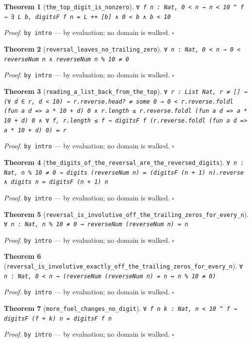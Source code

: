 \documentclass[11pt]{article}
\newtheorem{theorem}{Theorem}[section]
\begin{document}
\begin{theorem}[\texttt{the\_top\_digit\_is\_nonzero}]
\texttt{∀ f n : Nat, 0 < n → n < 10 ^ f → ∃ L b, digitsF f n = L ++ [b] ∧ 0 < b ∧ b < 10}
\end{theorem}
\noindent\emph{Proof.} \texttt{by
  intro} --- by evaluation; no domain is walked. \hfill$\square$

\begin{theorem}[\texttt{reversal\_leaves\_no\_trailing\_zero}]
\texttt{∀ n : Nat, 0 < n → 0 < reverseNum n ∧ reverseNum n \% 10 ≠ 0}
\end{theorem}
\noindent\emph{Proof.} \texttt{by
  intro} --- by evaluation; no domain is walked. \hfill$\square$

\begin{theorem}[\texttt{reading\_a\_list\_back\_from\_the\_top}]
\texttt{∀ r : List Nat, r ≠ [] → (∀ d ∈ r, d < 10) → r.reverse.head? ≠ some 0 → 0 < r.reverse.foldl (fun a d => a * 10 + d) 0 ∧ r.length ≤ r.reverse.foldl (fun a d => a * 10 + d) 0 ∧ ∀ f, r.length ≤ f → digitsF f (r.reverse.foldl (fun a d => a * 10 + d) 0) = r}
\end{theorem}
\noindent\emph{Proof.} \texttt{by
  intro} --- by evaluation; no domain is walked. \hfill$\square$

\begin{theorem}[\texttt{the\_digits\_of\_the\_reversal\_are\_the\_reversed\_digits}]
\texttt{∀ n : Nat, n \% 10 ≠ 0 → digits (reverseNum n) = (digitsF (n + 1) n).reverse ∧ digits n = digitsF (n + 1) n}
\end{theorem}
\noindent\emph{Proof.} \texttt{by
  intro} --- by evaluation; no domain is walked. \hfill$\square$

\begin{theorem}[\texttt{reversal\_is\_involutive\_off\_the\_trailing\_zeros\_for\_every\_n}]
\texttt{∀ n : Nat, n \% 10 ≠ 0 → reverseNum (reverseNum n) = n}
\end{theorem}
\noindent\emph{Proof.} \texttt{by
  intro} --- by evaluation; no domain is walked. \hfill$\square$

\begin{theorem}[\texttt{reversal\_is\_involutive\_exactly\_off\_the\_trailing\_zeros\_for\_every\_n}]
\texttt{∀ n : Nat, 0 < n → (reverseNum (reverseNum n) = n ↔ n \% 10 ≠ 0)}
\end{theorem}
\noindent\emph{Proof.} \texttt{by
  intro} --- by evaluation; no domain is walked. \hfill$\square$

\begin{theorem}[\texttt{more\_fuel\_changes\_no\_digit}]
\texttt{∀ f n k : Nat, n < 10 ^ f → digitsF (f + k) n = digitsF f n}
\end{theorem}
\noindent\emph{Proof.} \texttt{by
  intro} --- by evaluation; no domain is walked. \hfill$\square$
\end{document}
